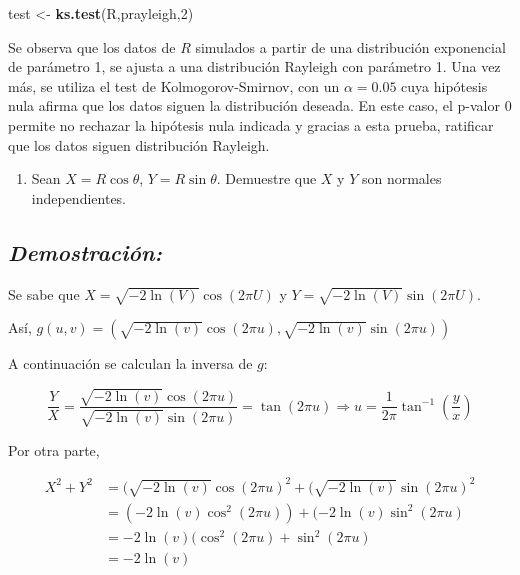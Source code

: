 \documentclass[]{article}
\newenvironment{Shaded}{\begin{snugshade}}{\end{snugshade}}
\newcommand{\KeywordTok}[1]{\textcolor[rgb]{0.13,0.29,0.53}{\textbf{#1}}}
\newcommand{\DecValTok}[1]{\textcolor[rgb]{0.00,0.00,0.81}{#1}}
\newcommand{\StringTok}[1]{\textcolor[rgb]{0.31,0.60,0.02}{#1}}
\newcommand{\NormalTok}[1]{#1}
\providecommand{\tightlist}{%
  \setlength{\itemsep}{0pt}\setlength{\parskip}{0pt}}
\begin{document}
\begin{Shaded}
\begin{Highlighting}[]
\NormalTok{test <-}\StringTok{ }\KeywordTok{ks.test}\NormalTok{(R,prayleigh,}\DecValTok{2}\NormalTok{)}
\end{Highlighting}
\end{Shaded}

Se observa que los datos de \(R\) simulados a partir de una distribución
exponencial de parámetro 1, se ajusta a una distribución Rayleigh con
parámetro 1. Una vez más, se utiliza el test de Kolmogorov-Smirnov, con
un \(\alpha=0.05\) cuya hipótesis nula afirma que los datos siguen la
distribución deseada. En este caso, el p-valor 0 permite no rechazar la
hipótesis nula indicada y gracias a esta prueba, ratificar que los datos
siguen distribución Rayleigh.

\begin{enumerate}
\def\labelenumi{\alph{enumi}.}
\setcounter{enumi}{1}
\tightlist
\item
  Sean \(X=R \cos\theta\), \(Y=R\sin\theta\). Demuestre que \(X\) y
  \(Y\) son normales independientes.
\end{enumerate}

\subsection{\texorpdfstring{\emph{Demostración:}}{Demostración:}}\label{demostracion-3}

Se sabe que \(X=\sqrt{-2\ln(V)}\cos(2\pi U)\) y
\(Y=\sqrt{-2\ln(V)}\sin(2\pi U)\).

Así,
\(g(u,v)=(\sqrt{-2\ln(v)}\cos(2\pi u),\sqrt{-2\ln(v)}\sin(2\pi u))\)

A continuación se calculan la inversa de \(g\):

\begin{equation}
\frac{Y}{X}=\frac{\sqrt{-2\ln(v)}\cos(2\pi u)}{\sqrt{-2\ln(v)}\sin(2\pi u)}
=\tan(2 \pi u) \Rightarrow u=\frac{1}{2 \pi}\tan^{-1}\left( \frac{y}{x}  \right)
\end{equation}

Por otra parte,

\begin{equation}
\begin{split}
X^2+Y^2&=(\sqrt{-2\ln(v)}\cos(2\pi u)^2+(\sqrt{-2\ln(v)}\sin(2\pi u)^2\\
&= (-2\ln(v)\cos^2(2\pi u))+(-2\ln(v)\sin^2(2\pi u)\\
&= -2\ln(v)(\cos^2(2\pi u)+\sin^2(2\pi u)\\
&= -2\ln(v)
\end{split}
\end{equation}
\end{document}
